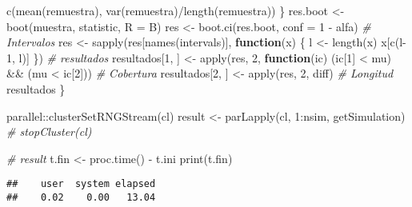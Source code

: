 \documentclass[
]{book}
\newenvironment{Shaded}{\begin{snugshade}}{\end{snugshade}}
\newcommand{\AttributeTok}[1]{\textcolor[rgb]{0.77,0.63,0.00}{#1}}
\newcommand{\CommentTok}[1]{\textcolor[rgb]{0.56,0.35,0.01}{\textit{#1}}}
\newcommand{\ControlFlowTok}[1]{\textcolor[rgb]{0.13,0.29,0.53}{\textbf{#1}}}
\newcommand{\DecValTok}[1]{\textcolor[rgb]{0.00,0.00,0.81}{#1}}
\newcommand{\FunctionTok}[1]{\textcolor[rgb]{0.00,0.00,0.00}{#1}}
\newcommand{\NormalTok}[1]{#1}
\newcommand{\OtherTok}[1]{\textcolor[rgb]{0.56,0.35,0.01}{#1}}
\newcommand{\SpecialCharTok}[1]{\textcolor[rgb]{0.00,0.00,0.00}{#1}}
\theoremstyle{break}
\theoremstyle{definition}
\theoremstyle{definition}
\theoremstyle{definition}
\theoremstyle{definition}
\theoremstyle{remark}
\begin{document}
\begin{Shaded}
\begin{Highlighting}[]
      \FunctionTok{c}\NormalTok{(}\FunctionTok{mean}\NormalTok{(remuestra), }\FunctionTok{var}\NormalTok{(remuestra)}\SpecialCharTok{/}\FunctionTok{length}\NormalTok{(remuestra))}
\NormalTok{    \}}
\NormalTok{    res.boot }\OtherTok{\textless{}{-}} \FunctionTok{boot}\NormalTok{(muestra, statistic, }\AttributeTok{R =}\NormalTok{ B)}
\NormalTok{    res }\OtherTok{\textless{}{-}} \FunctionTok{boot.ci}\NormalTok{(res.boot, }\AttributeTok{conf =} \DecValTok{1} \SpecialCharTok{{-}}\NormalTok{ alfa)}
    \CommentTok{\# Intervalos}
\NormalTok{    res }\OtherTok{\textless{}{-}} \FunctionTok{sapply}\NormalTok{(res[}\FunctionTok{names}\NormalTok{(intervals)], }\ControlFlowTok{function}\NormalTok{(x) \{}
\NormalTok{      l }\OtherTok{\textless{}{-}} \FunctionTok{length}\NormalTok{(x)}
\NormalTok{      x[}\FunctionTok{c}\NormalTok{(l}\DecValTok{{-}1}\NormalTok{, l)]}
\NormalTok{    \})}
    \CommentTok{\# resultados}
\NormalTok{    resultados[}\DecValTok{1}\NormalTok{, ] }\OtherTok{\textless{}{-}} \FunctionTok{apply}\NormalTok{(res, }\DecValTok{2}\NormalTok{,}
                                   \ControlFlowTok{function}\NormalTok{(ic) (ic[}\DecValTok{1}\NormalTok{] }\SpecialCharTok{\textless{}}\NormalTok{ mu) }\SpecialCharTok{\&\&}\NormalTok{ (mu }\SpecialCharTok{\textless{}}\NormalTok{ ic[}\DecValTok{2}\NormalTok{])) }\CommentTok{\# Cobertura}
\NormalTok{    resultados[}\DecValTok{2}\NormalTok{, ] }\OtherTok{\textless{}{-}} \FunctionTok{apply}\NormalTok{(res, }\DecValTok{2}\NormalTok{, diff) }\CommentTok{\# Longitud}
\NormalTok{    resultados}
\NormalTok{\}}

\NormalTok{parallel}\SpecialCharTok{::}\FunctionTok{clusterSetRNGStream}\NormalTok{(cl)}
\NormalTok{result }\OtherTok{\textless{}{-}} \FunctionTok{parLapply}\NormalTok{(cl, }\DecValTok{1}\SpecialCharTok{:}\NormalTok{nsim, getSimulation)}
\CommentTok{\# stopCluster(cl)}

\CommentTok{\# result}
\NormalTok{t.fin }\OtherTok{\textless{}{-}} \FunctionTok{proc.time}\NormalTok{() }\SpecialCharTok{{-}}\NormalTok{ t.ini}
\FunctionTok{print}\NormalTok{(t.fin)}
\end{Highlighting}
\end{Shaded}

\begin{verbatim}
##    user  system elapsed 
##    0.02    0.00   13.04
\end{verbatim}
\end{document}
